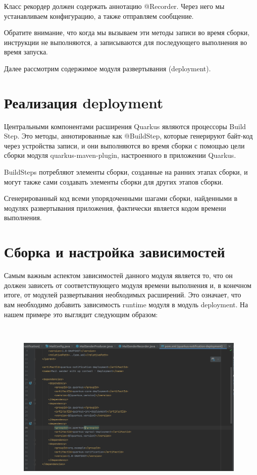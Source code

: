 \documentclass[russian,11pt]{article}
\begin{document}
	Класс рекордер должен содержать аннотацию @Recorder. Через него мы устанавливаем конфигурацию, а также отправляем сообщение.
	
	Обратите внимание, что когда мы вызываем эти методы записи во время сборки, инструкции не выполняются, а записываются для последующего выполнения во время запуска.
	
Далее рассмотрим содержимое модуля развертывания (deployment).

\section{Реализация deployment}

Центральными компонентами расширения Quarkus являются процессоры Build Step. Это методы, аннотированные как @BuildStep, которые генерируют байт-код через устройства записи, и они выполняются во время сборки с помощью цели сборки модуля quarkus-maven-plugin, настроенного в приложении Quarkus.

	BuildSteps потребляют элементы сборки, созданные на ранних этапах сборки, и могут также сами создавать элементы сборки для других этапов сборки.

	Сгенерированный код всеми упорядоченными шагами сборки, найденными в модулях развертывания приложения, фактически является кодом времени выполнения.

\section{Сборка и настройка зависимостей}

Самым важным аспектом зависимостей данного модуля является то, что он должен зависеть от соответствующего модуля времени выполнения и, в конечном итоге, от модулей развертывания необходимых расширений. Это означает, что вам необходимо добавить зависимость runtime модуля в модуль deployment. На нашем примере это выглядит следующим образом:

~

\begin{figure}[H]
	\centering
	\includegraphics[width=\textwidth]{9}
\end{figure}
\end{document}
